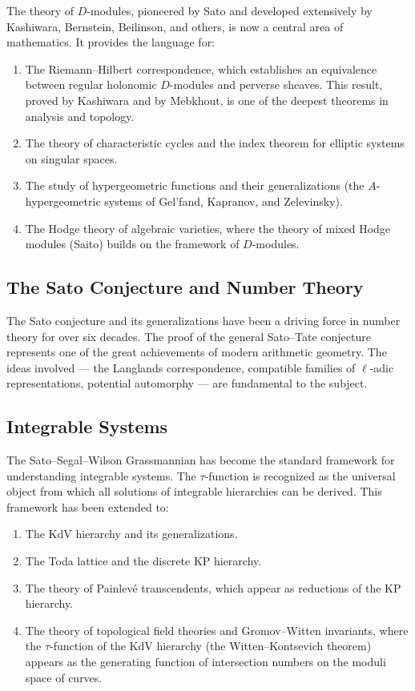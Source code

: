 The theory of \(D\)-modules, pioneered by Sato and developed extensively by Kashiwara, Bernstein, Beilinson, and others, is now a central area of mathematics. It provides the language for:

\begin{enumerate}
    \item The Riemann--Hilbert correspondence, which establishes an equivalence between regular holonomic \(D\)-modules and perverse sheaves. This result, proved by Kashiwara and by Mebkhout, is one of the deepest theorems in analysis and topology.
    
    \item The theory of characteristic cycles and the index theorem for elliptic systems on singular spaces.
    
    \item The study of hypergeometric functions and their generalizations (the \(A\)-hypergeometric systems of Gel'fand, Kapranov, and Zelevinsky).
    
    \item The Hodge theory of algebraic varieties, where the theory of mixed Hodge modules (Saito) builds on the framework of \(D\)-modules.
\end{enumerate}

\subsection{The Sato Conjecture and Number Theory}

The Sato conjecture and its generalizations have been a driving force in number theory for over six decades. The proof of the general Sato--Tate conjecture represents one of the great achievements of modern arithmetic geometry. The ideas involved --- the Langlands correspondence, compatible families of \(\ell\)-adic representations, potential automorphy --- are fundamental to the subject.

\subsection{Integrable Systems}

The Sato--Segal--Wilson Grassmannian has become the standard framework for understanding integrable systems. The \(\tau\)-function is recognized as the universal object from which all solutions of integrable hierarchies can be derived. This framework has been extended to:

\begin{enumerate}
    \item The KdV hierarchy and its generalizations.
    \item The Toda lattice and the discrete KP hierarchy.
    \item The theory of Painlev\'e transcendents, which appear as reductions of the KP hierarchy.
    \item The theory of topological field theories and Gromov--Witten invariants, where the \(\tau\)-function of the KdV hierarchy (the Witten--Kontsevich theorem) appears as the generating function of intersection numbers on the moduli space of curves.
\end{enumerate}

